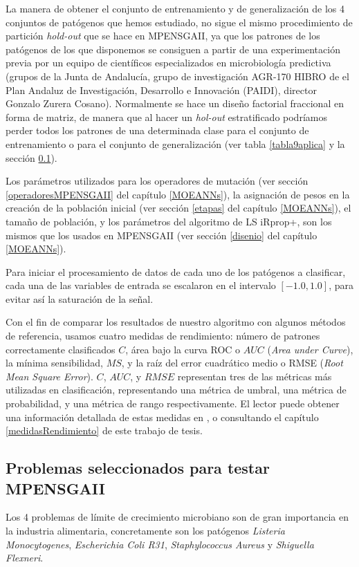 La manera de obtener el conjunto de entrenamiento y de generalización de los 4 conjuntos
de patógenos que hemos estudiado, no sigue el mismo procedimiento de partición
\textit{hold-out} que se hace en MPENSGAII, ya que los patrones de
los patógenos de los que disponemos se consiguen a partir de una experimentación previa por un
equipo de científicos especializados en microbiología predictiva (grupos de la Junta de
Andalucía, grupo de investigación AGR-170 HIBRO de el Plan Andaluz de Investigación,
Desarrollo e Innovación (PAIDI), director Gonzalo Zurera Cosano). Normalmente se hace
un
diseño factorial fraccional en forma de matriz, de manera que al hacer un
\textit{hol-out} estratificado podríamos perder todos los patrones de una determinada clase
para el conjunto de entrenamiento o para el conjunto de generalización (ver tabla
\ref{tabla9aplica} y la sección \ref{problemas}).

Los parámetros utilizados para los operadores de mutación (ver sección
\ref{operadoresMPENSGAII} del capítulo \ref{MOEANNs}), la asignación de pesos en la
creación de la población inicial (ver sección \ref{etapas} del capítulo \ref{MOEANNs}), el
tamaño de población, y los parámetros del algoritmo de LS iRprop+, son los mismos que los usados en
MPENSGAII (ver sección \ref{disenio} del capítulo \ref{MOEANNs}).

Para iniciar el procesamiento de datos de cada uno de los patógenos a clasificar, cada una
de las variables de entrada se escalaron en el intervalo $[-1.0, 1.0]$, para evitar así la
saturación de la señal.

Con el fin de comparar los resultados de nuestro algoritmo con algunos métodos
de referencia, usamos cuatro medidas de rendimiento: número de patrones correctamente
clasificados $C$, área bajo la curva ROC o $AUC$ (\textit{Area under Curve}), la mínima
sensibilidad, $MS$, y la raíz del error cuadrático medio o RMSE (\textit{Root Mean Square
Error}).
$C$, $AUC$, y $RMSE$ representan tres de las métricas más utilizadas en clasificación,
representando una
métrica de umbral, una métrica de probabilidad, y una métrica de rango respectivamente.
El lector puede obtener una información detallada de estas medidas en
\cite{Fawcett2006,Caruana2004}, o consultando el capítulo \ref{medidasRendimiento} de
este trabajo de tesis.

\subsection{Problemas seleccionados para testar MPENSGAII}\label{problemas}
\noindent Los 4 problemas de límite de crecimiento microbiano son de gran
importancia en la industria alimentaria, concretamente son los patógenos \textit{Listeria
Monocytogenes}, \textit{Escherichia Coli R31},
\textit{Staphylococcus
Aureus} y \textit{Shiguella Flexneri}.

